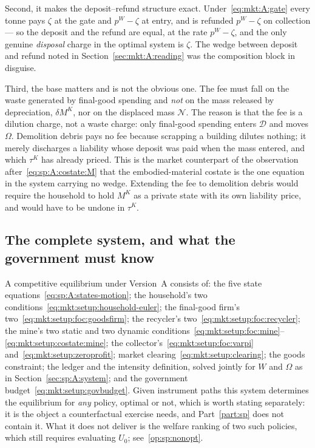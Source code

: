 Second, it makes the deposit--refund structure exact. Under~\eqref{eq:mkt:A:gate} every tonne pays
$\zeta$ at the gate and $p^W-\zeta$ at entry, and is refunded $p^W-\zeta$ on collection --- so the
deposit and the refund are equal, at the rate $p^W-\zeta$, and the only genuine \emph{disposal} charge
in the optimal system is $\zeta$. The wedge between deposit and refund noted in
Section~\ref{sec:mkt:A:reading} was the composition block in disguise.

Third, the base matters and is not the obvious one. The fee must fall on the waste generated by
final-good spending and \emph{not} on the mass released by depreciation, $\delta M^K$, nor on the
displaced mass $\mathcal N$. The reason is that the fee is a dilution charge, not a waste charge: only
final-good spending enters $\mathcal D$ and moves $\Omega$. Demolition debris pays no fee because
scrapping a building dilutes nothing; it merely discharges a liability whose deposit was paid when the
mass entered, and which $\tau^K$ has already priced. This is the market counterpart of the observation
after~\eqref{eq:sp:A:costate:M} that the embodied-material costate is the one equation in the system
carrying no wedge. Extending the fee to demolition debris would require the household to hold $M^K$ as
a private state with its own liability price, and would have to be undone in $\tau^K$.


\subsection{The complete system, and what the government must know}\label{sec:mkt:A:system}

 A competitive equilibrium under Version~A consists of: the five state
equations~\eqref{eq:sp:A:states-motion}; the household's two
conditions~\eqref{eq:mkt:setup:household-euler}; the final-good firm's
two~\eqref{eq:mkt:setup:foc:goodsfirm}; the recycler's two~\eqref{eq:mkt:setup:foc:recycler}; the
mine's two static and two dynamic conditions~\eqref{eq:mkt:setup:foc:mine}--\eqref{eq:mkt:setup:costate:mine};
the collector's~\eqref{eq:mkt:setup:foc:varpi} and~\eqref{eq:mkt:setup:zeroprofit}; market
clearing~\eqref{eq:mkt:setup:clearing}; the goods constraint; the ledger and the intensity definition,
solved jointly for $W$ and $\Omega$ as in Section~\ref{sec:sp:A:system}; and the government
budget~\eqref{eq:mkt:setup:govbudget}. Given instrument paths this system determines the equilibrium
for \emph{any} policy, optimal or not, which is worth stating separately: it is the object a
counterfactual exercise needs, and Part~\ref{part:sp} does not contain it. What it does not deliver is
the welfare ranking of two such policies, which still requires evaluating $U_0$; see~\ref{op:sp:nonopt}.

